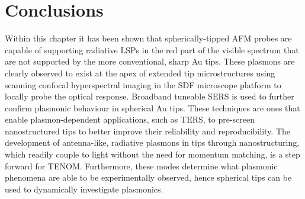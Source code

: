 \documentclass[12pt, a4paper, oneside]{book}
\begin{document}
\section{Conclusions}


Within this chapter it has been shown that spherically-tipped AFM probes are capable of supporting radiative LSPs in the red part of the visible spectrum that are not supported by the more conventional, sharp Au tips. These plasmons are clearly observed to exist at the apex of extended tip microstructures using scanning confocal hyperspectral imaging in the SDF microscope platform to locally probe the optical response. Broadband tuneable SERS is used to further confirm plasmonic behaviour in spherical Au tips. These techniques are ones that enable plasmon-dependent applications, such as TERS, to pre-screen nanostructured tips to better improve their reliability and reproducibility. The development of antenna-like, radiative plasmons in tips through nanostructuring, which readily couple to light without the need for momentum matching, is a step forward for TENOM. Furthermore, these modes determine what plasmonic phenomena are able to be experimentally observed, hence spherical tips can be used to dynamically investigate plasmonics.

\ifstandalone
\begin{singlespace}
\fontsize{8pt}{1em}\selectfont
\printbibliography[notcategory=fullcited]
\end{singlespace}
\fi
\end{document}
